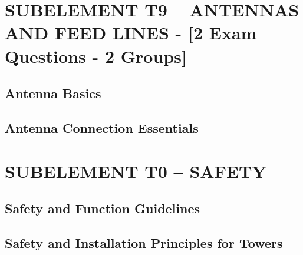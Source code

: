 \documentclass[12pt]{book}
\begin{document}
\chapter{SUBELEMENT T9 – ANTENNAS AND FEED LINES - [2 Exam Questions - 2 Groups]}
\section{Antenna Basics}












\section{Antenna Connection Essentials}












\chapter{SUBELEMENT T0 – SAFETY}
\section{Safety and Function Guidelines}












\section{Safety and Installation Principles for Towers}











\end{document}
